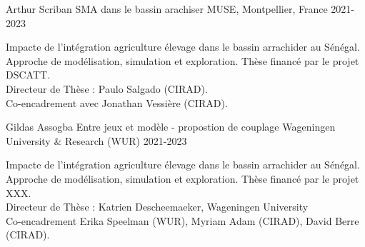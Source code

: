 \begin{cventries}
    \cventry
      {Arthur Scriban} %
      {SMA dans le bassin arachiser} %
      {MUSE, Montpellier, France} %
      {2021-2023} %
      {
        \begin{cvitems} %
         Impacte de l'intégration agriculture élevage dans le bassin arrachider au Sénégal. Approche de modélisation, simulation et exploration. Thèse financé par le projet DSCATT.\\
         Directeur de Thèse : Paulo Salgado (CIRAD).\\
         Co-encadrement avec Jonathan Vessière (CIRAD).
        \end{cvitems}
      }
    
    \cventry
      {Gildas Assogba} %
      {Entre jeux et modèle - propostion de couplage} %
      {Wageningen University \& Research (WUR)} %
      {2021-2023} %
      {
        \begin{cvitems} %
         Impacte de l'intégration agriculture élevage dans le bassin arrachider au Sénégal. Approche de modélisation, simulation et exploration. Thèse financé par le projet XXX.\\
         Directeur de Thèse : Katrien Descheemaeker, Wageningen University\\
         Co-encadrement Erika Speelman (WUR), Myriam Adam (CIRAD), David Berre (CIRAD).
        \end{cvitems}
      }  
\end{cventries}

